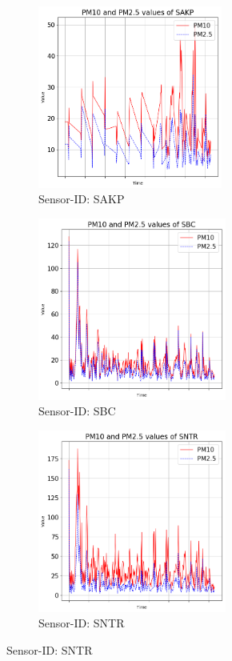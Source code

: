 \documentclass[12pt,a4paper,twoside]{scrartcl}
\numberwithin{equation}{section}
\begin{document}
\begin{figure}[H]
  \centering
  \begin{subfigure}[t]{0.32\textwidth}
    \includegraphics[width=\textwidth,height=6cm]{figures/plots_1d/SAKP_plot_P1_P2}%
    \caption{Sensor-ID: SAKP}
  \end{subfigure}
  \begin{subfigure}[t]{0.32\textwidth}
    \includegraphics[width=\textwidth,height=6cm]{figures/plots_1d/SBC_plot_P1_P2}%
    \caption{Sensor-ID: SBC}
  \end{subfigure}
  \begin{subfigure}[t]{0.32\textwidth}
    \includegraphics[width=\textwidth,height=6cm]{figures/plots_1d/SNTR_plot_P1_P2}%
    \caption{Sensor-ID: SNTR}
  \end{subfigure}


\end{figure}
\end{document}
